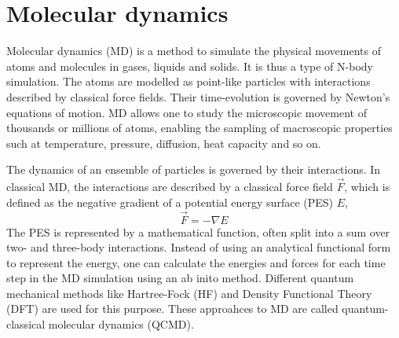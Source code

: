\documentclass[twoside,english]{uiofysmaster}
\begin{document}
\chapter{Molecular dynamics}
Molecular dynamics (MD) is a method to simulate the physical movements of atoms and molecules in gases, liquids and solids. 
It is thus a type of N-body simulation. The atoms are modelled as point-like particles with interactions described
by classical force fields. Their time-evolution is governed by Newton's equations of motion. MD allows one to study the microscopic
movement of thousands or millions of atoms, enabling the sampling of macroscopic properties such at temperature, pressure, 
diffusion, heat capacity and so on. 

The dynamics of an ensemble of particles is governed by their interactions. 
In classical MD, the interactions are described
by a classical force field $\vec{F}$, which is defined as the negative gradient of a potential energy surface (PES) $E$,
\begin{equation}
 \vec{F} = -\nabla E
\end{equation}
The PES is represented by a mathematical function, often split into a sum over two- and three-body interactions. 
Instead of using an analytical functional form to represent the energy, one can 
calculate the energies and forces for each time step in the MD simulation using an ab inito method. 
Different quantum mechanical methods like Hartree-Fock (HF) and Density Functional Theory (DFT) are used for this purpose. 
These approahces to MD are called quantum-classical molecular dynamics (QCMD). 
\end{document}
